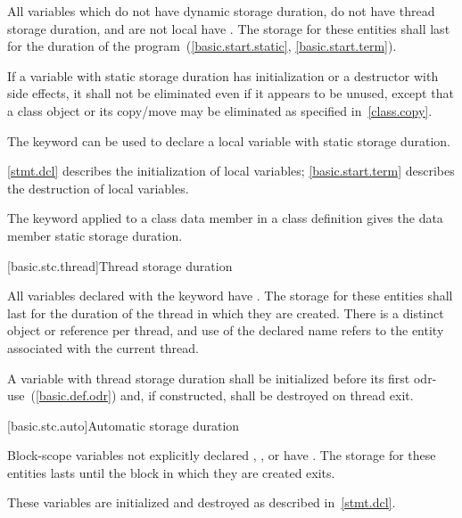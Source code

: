 \pnum
{}%
All variables which do not have dynamic storage duration, do not have thread
storage duration, and are not local
have . The
storage for these entities shall last for the duration of the
program~(\ref{basic.start.static}, \ref{basic.start.term}).

\pnum
If a variable with static storage duration has initialization or a
destructor with side effects, it shall not be eliminated even if it
appears to be unused, except that a class object or its copy/move may be
eliminated as specified in~\ref{class.copy}.

\pnum
{}%
The keyword  can be used to declare a local variable with
static storage duration. \begin{note} \ref{stmt.dcl} describes the
initialization of local  variables; \ref{basic.start.term}
describes the destruction of local  variables. \end{note}

\pnum
{}%
The keyword  applied to a class data member in a class
definition gives the data member static storage duration.

[basic.stc.thread]{Thread storage duration}

\pnum
{}%
All variables declared with the  keyword have . The storage for these entities shall last for the duration of
the thread in which they are created. There is a distinct object or reference
per thread, and use of the declared name refers to the entity associated with
the current thread.

\pnum
A variable with thread storage duration shall be initialized before
its first odr-use~(\ref{basic.def.odr}) and, if constructed, shall be destroyed on thread exit.

[basic.stc.auto]{Automatic storage duration}

\pnum
{}%
%
Block-scope variables
not explicitly declared , , or  have
. The storage
for these entities lasts until the block in which they are created exits.

\pnum
\begin{note}
These variables are initialized and destroyed as described in~\ref{stmt.dcl}.
\end{note}

